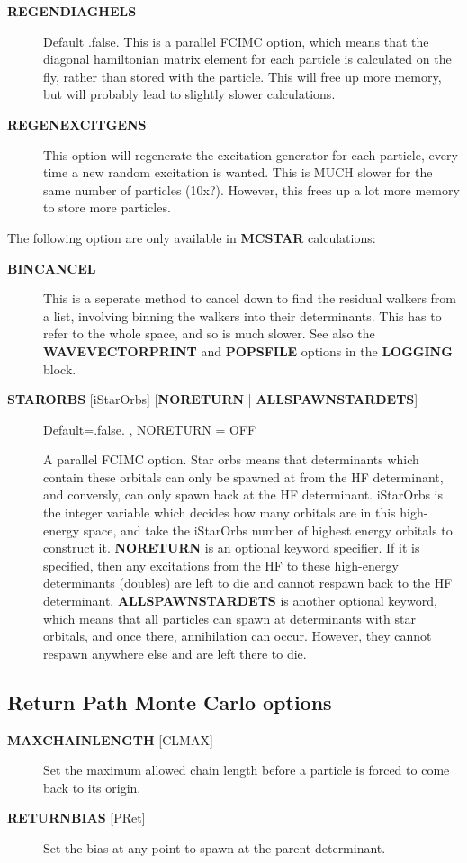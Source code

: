 \documentclass[openany,a4paper,10pt]{manual}
\begin{document}
\begin{description}
\item[\textbf{REGENDIAGHELS}]
Default .false.
This is a parallel FCIMC option, which means that the diagonal hamiltonian matrix
element for each particle is calculated on the fly, rather than stored with the
particle. This will free up more memory, but will probably lead to slightly slower
calculations.

\item[\textbf{REGENEXCITGENS}]
This option will regenerate the excitation generator for each particle, every time a
new random excitation is wanted. This is MUCH slower for the same number of particles
(10x?). However, this frees up a lot more memory to store more particles.

\end{description}

The following option are only available in \textbf{MCSTAR} calculations:
\begin{description}
\item[\textbf{BINCANCEL}]
This is a seperate method to cancel down to find the residual
walkers from a list, involving binning the walkers into their
determinants. This has to refer to the whole space, and so is
much slower.  See also the \textbf{WAVEVECTORPRINT} and \textbf{POPSFILE}
options in the \textbf{LOGGING} block.

\item[\textbf{STARORBS} {[}iStarOrbs{]} {[}\textbf{NORETURN} | \textbf{ALLSPAWNSTARDETS}{]}]
Default=.false. , NORETURN = OFF

A parallel FCIMC option. Star orbs means that determinants which
contain these orbitals can only be spawned at from the HF determinant,
and conversly, can only spawn back at the HF determinant. iStarOrbs is
the integer variable which decides how many orbitals are in this high-
energy space, and take the iStarOrbs number of highest energy orbitals
to construct it. \textbf{NORETURN} is an optional keyword specifier. If it
is specified, then any excitations from the HF to these high-energy
determinants (doubles) are left to die and cannot respawn back to the
HF determinant. \textbf{ALLSPAWNSTARDETS} is another optional keyword, which
means that all particles can spawn at determinants with star orbitals, and
once there, annihilation can occur. However, they cannot respawn anywhere
else and are left there to die.

\end{description}


\subsection{Return Path Monte Carlo options}
\begin{description}
\item[\textbf{MAXCHAINLENGTH} {[}CLMAX{]}]
Set the maximum allowed chain length before a particle is forced to
come back to its origin.

\item[\textbf{RETURNBIAS} {[}PRet{]}]
Set the bias at any point to spawn at the parent determinant.

\end{description}
\end{document}
